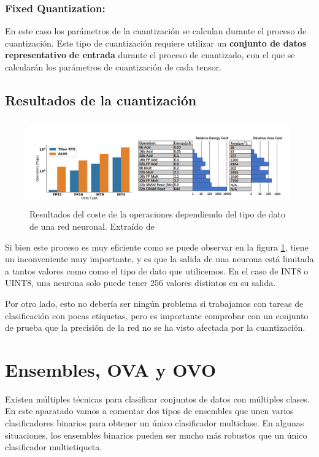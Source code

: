 \subsubsection{Fixed Quantization:}
En este caso los parámetros de la cuantización se calculan durante el
proceso de cuantización. Este tipo de cuantización requiere utilizar un
\textbf{conjunto de datos representativo} \textbf{de entrada} durante el
proceso de cuantizado, con el que se calcularán los parámetros de
cuantización de cada tensor.

\hypertarget{resultados-de-la-cuantizaciuxf3n}{%
\subsection{Resultados de la
cuantización}\label{resultados-de-la-cuantizaciuxf3n}}
\begin{figure}
    \centering
    \includegraphics[width=5in,height=1.45833in]{img/3/quant_res.png}
    \caption{Resultados del coste de la operaciones dependiendo del tipo de dato de una red neuronal. Extraído de \cite{quant_survey}}
    \label{fig:quant-res}
\end{figure}

Si bien este proceso es muy eficiente como se puede observar en la figura \ref{fig:quant-res}, tiene un inconveniente muy
importante, y es que la salida de una neurona está limitada a tantos
valores como como el tipo de dato que utilicemos. En el caso de INT8 o UINT8, una neurona solo puede tener 256 valores distintos en su salida.

Por otro lado, esto no debería ser ningún problema si trabajamos con
tareas de clasificación con pocas etiquetas, pero es importante comprobar con un conjunto de
prueba que la precisión de la red no se ha visto afectada por la
cuantización.


\hypertarget{ensembles-ova-y-ovo}{%
\section{Ensembles, OVA y OVO}\label{ensembles-ova-y-ovo}}

Existen múltiples técnicas para clasificar conjuntos de datos con múltiples
clases. En este aparatado vamos a comentar dos tipos de ensembles que
unen varios clasificadores binarios para obtener un único clasificador
multiclase.
En algunas situaciones, los ensembles binarios pueden ser mucho más robustos que un único clasificador multietiqueta. 

